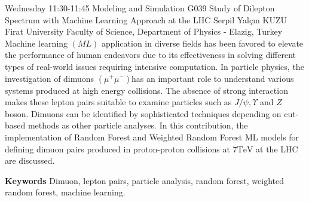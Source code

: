 
    \begin{abstract_basarim}
    {Wednesday 11:30-11:45}
    {Modeling and Simulation}
    {G039}
    {Study of Dilepton Spectrum with Machine Learning Approach at the LHC}
    {%
    Serpil Yalçın KUZU}
    {%
    }
    {%
    Firat University Faculty of Science, Department of Physics - Elazig, Turkey}
    Machine learning $(M L)$ application in diverse fields has been favored to elevate the performance of human endeavors due to its effectiveness in solving different types of real-world issues requiring intensive computation. In particle physics, the investigation of dimuons $\left(\mu^{+} \mu^{-}\right)$has an important role to understand various systems produced at high energy collisions. The absence of strong interaction makes these lepton pairs suitable to examine particles such as $J / \psi, \Upsilon$ and $Z$ boson. Dimuons can be identified by sophisticated techniques depending on cut-based methods as other particle analyses. In this contribution, the implementation of Random Forest and Weighted Random Forest ML models for defining dimuon pairs produced in proton-proton collisions at $7 \mathrm{TeV}$ at the LHC are discussed. 
    
        \textbf{Keywords} \newline{}Dimuon, lepton pairs, particle analysis, random forest, weighted random forest, machine learning.
    \end{abstract_basarim}
    